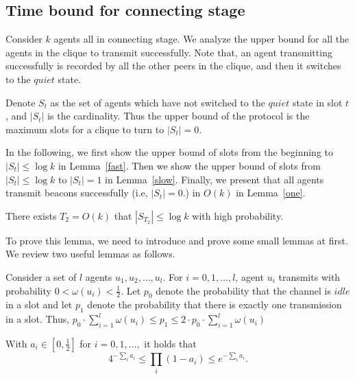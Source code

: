 \subsection{Time bound for connecting stage}
\label{boundPC}

Consider $k$ agents all in connecting stage.
We analyze the upper bound 
for all the agents in the clique to transmit successfully.
Note that, an agent transmitting successfully is recorded by 
all the other peers in the clique, and then it switches to the $quiet$ state. 

Denote $S_t$ as the set of agents
which have not switched to the $quiet$ state in slot $t$, and 
$|S_t|$ is the cardinality. 
Thus the upper bound of the protocol is the maximum slots
for a clique to turn to $|S_t| = 0$.

In the following, we first show the
upper bound of slots from the beginning to $|S_t| \leq \log k$ in Lemma~\ref{fast}.
Then we show the upper bound of slots from $|S_t| \leq \log k$ to $|S_t| = 1$ in Lemma~\ref{slow}.
Finally, we present that all agents transmit beacons successfully (i.e, $|S_t| = 0$.) in $O(k)$ 
in Lemma~\ref{one}. 

\begin{lemma}
    \label{fast}
    There exists $T_2=O(k)$ that $|S_{T_2}| \leq \log k$ with high probability. 
\end{lemma}

To prove this lemma, we need to introduce and prove some small lemmas at first.
We review two useful lemmas as follows.

\begin{lemma}
    \label{sumP}
    Consider a set of $l$ agents $u_1, u_2,\dots, u_l$.
    For $i = 0, 1, \dots, l$, agent $u_i$ transmits with probability 
    $0 < \omega(u_i) < \frac{1}{2}$. Let $p_0$ denote the 
    probability that the channel is $idle$ in a slot and let $p_1$ denote 
    the probability that there is exactly one transmission in a slot.
    Thus, $p_0\cdot {\sum}_{i=1}^{l}\omega(u_i)\leq p_1 \leq
    2\cdot p_0\cdot {\sum}_{i=1}^{l}\omega(u_i)$     
\end{lemma}

\begin{lemma}
    \label{mulP}
    With $a_i \in [0, \frac{1}{2}]$ for $i = 0,1,\dots,$ it holds that
    \begin{equation}
        \label{mul}
        4^{-{\sum}_{i}a_i}\leq {\prod}_{i}(1-a_i)\leq e^{-{\sum}_{i}a_i}. 
    \end{equation}
\end{lemma}

